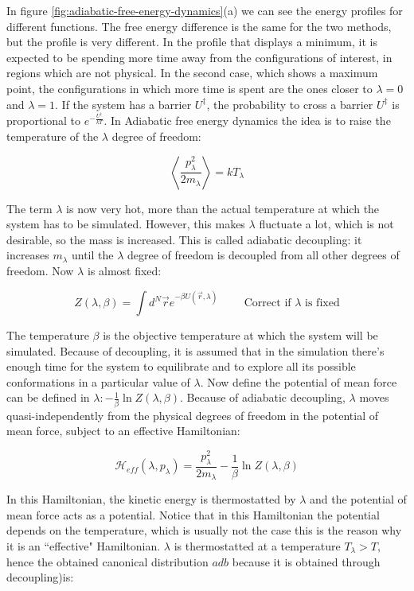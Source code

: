 	In figure \ref{fig:adiabatic-free-energy-dynamics}(a) we can see the energy profiles for different functions.
	The free energy difference is the same for the two methods, but the profile is very different.
	In the profile that displays a minimum, it is expected to be spending more time away from the configurations of interest, in regions which are not physical.
	In the second case, which shows a maximum point, the configurations in which more time is spent are the ones closer to $\lambda = 0$ and $\lambda = 1$.
	If the system has a barrier $U^{\ddagger}$, the probability to cross a barrier $U^{\ddagger}$ is proportional to $e^{-\frac{U^{\ddagger}}{kT}}$.
	In Adiabatic free energy dynamics the idea is to raise the temperature of the $\lambda$ degree of freedom:

	$$\left\langle\frac{p_\lambda^2}{2m_\lambda}\right\rangle = kT_\lambda$$

	The term $\lambda$ is now very hot, more than the actual temperature at which the system has to be simulated.
	However, this makes $\lambda$ fluctuate a lot, which is not desirable, so the mass is increased.
	This is called adiabatic decoupling: it increases $m_\lambda$ until the $\lambda$ degree of freedom is decoupled from all other degrees of freedom.
	Now $\lambda$ is almost fixed:

	$$Z(\lambda, \beta) = \int d^N\vec{r}e^{-\beta U(\vec{r}, \lambda)}\qquad\text{ Correct if }\lambda\text{ is fixed}$$

	The temperature $\beta$ is the objective temperature at which the system will be simulated.
	Because of decoupling, it is assumed that in the simulation there's enough time for the system to equilibrate and to explore all its possible conformations in a particular value of $\lambda$.
	Now define the potential of mean force can be defined in $\lambda:-\frac{1}{\beta}\ln Z(\lambda, \beta)$.
	Because of adiabatic decoupling, $\lambda$ moves quasi-independently from the physical degrees of freedom in the potential of mean force, subject to an effective Hamiltonian:

	$$\mathcal{H}_{eff}(\lambda, p_\lambda) = \frac{p_\lambda^2}{2m_\lambda} -\frac{1}{\beta}\ln Z(\lambda, \beta)$$

	In this Hamiltonian, the kinetic energy is thermostatted by $\lambda$ and the potential of mean force acts as a potential.
	Notice that in this Hamiltonian the potential depends on the temperature, which is usually not the case this is the reason why it is an ``effective" Hamiltonian.
	$\lambda$ is thermostatted at a temperature $T_\lambda>T$, hence the obtained canonical distribution $adb$ because it is obtained through decoupling)is:

